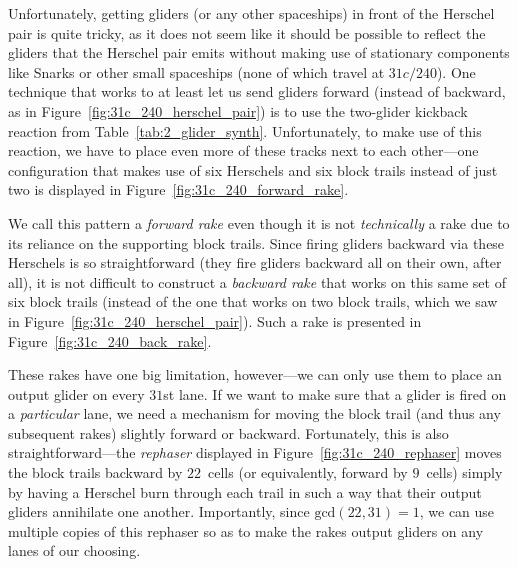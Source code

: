 Unfortunately, getting gliders (or any other spaceships) in front of the Herschel pair is quite tricky, as it does not seem like it should be possible to reflect the gliders that the Herschel pair emits without making use of stationary components like Snarks or other small spaceships (none of which travel at $31c/240$). One technique that works to at least let us send gliders forward (instead of backward, as in Figure~\ref{fig:31c_240_herschel_pair}) is to use the two-glider kickback reaction from Table~\ref{tab:2_glider_synth}. Unfortunately, to make use of this reaction, we have to place even more of these tracks next to each other---one configuration that makes use of six Herschels and six block trails instead of just two is displayed in Figure~\ref{fig:31c_240_forward_rake}.

We call this pattern a \emph{forward rake} even though it is not \emph{technically} a rake due to its reliance on the supporting block trails. Since firing gliders backward via these Herschels is so straightforward (they fire gliders backward all on their own, after all), it is not difficult to construct a \emph{backward rake} that works on this same set of six block trails (instead of the one that works on two block trails, which we saw in Figure~\ref{fig:31c_240_herschel_pair}). Such a rake is presented in Figure~\ref{fig:31c_240_back_rake}.

These rakes have one big limitation, however---we can only use them to place an output glider on every $31$st lane. If we want to make sure that a glider is fired on a \emph{particular} lane, we need a mechanism for moving the block trail (and thus any subsequent rakes) slightly forward or backward. Fortunately, this is also straightforward---the \emph{rephaser} displayed in Figure~\ref{fig:31c_240_rephaser} moves the block trails backward by $22$~cells (or equivalently, forward by $9$~cells) simply by having a Herschel burn through each trail in such a way that their output gliders annihilate one another. Importantly, since $\mathrm{gcd}(22,31) = 1$, we can use multiple copies of this rephaser so as to make the rakes output gliders on any lanes of our choosing.

